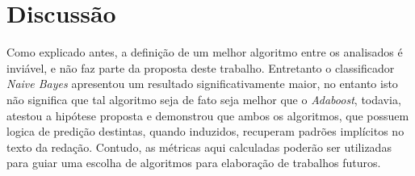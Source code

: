 \section{Discussão}

Como explicado antes, a definição de um melhor algoritmo entre os analisados é 
inviável, e não faz parte da proposta deste trabalho. Entretanto o 
classificador \textit{Naive Bayes} apresentou um resultado significativamente 
maior, no entanto isto não significa que tal algoritmo seja de fato seja melhor 
que o \textit{Adaboost}, todavia, atestou a hipótese proposta e demonstrou que 
ambos os algoritmos, que possuem logica de predição destintas, quando 
induzidos, recuperam padrões implícitos no texto da redação. Contudo, as 
métricas aqui calculadas poderão ser utilizadas para guiar uma escolha de 
algoritmos para elaboração de trabalhos futuros.
